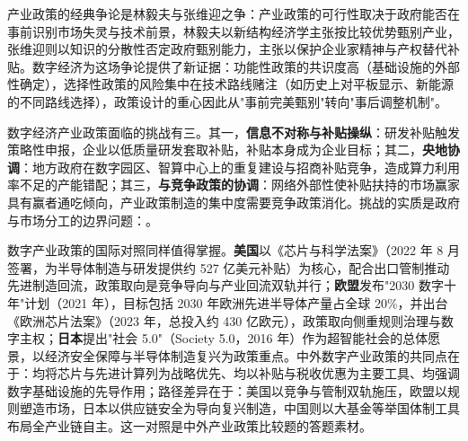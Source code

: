 产业政策的经典争论是林毅夫与张维迎之争：产业政策的可行性取决于政府能否在事前识别市场失灵与技术前景，林毅夫以新结构经济学主张按比较优势甄别产业，张维迎则以知识的分散性否定政府甄别能力，主张以保护企业家精神与产权替代补贴。数字经济为这场争论提供了新证据：功能性政策的共识度高（基础设施的外部性确定），选择性政策的风险集中在技术路线赌注（如历史上对平板显示、新能源的不同路线选择），政策设计的重心因此从"事前完美甄别"转向"事后调整机制"。

数字经济产业政策面临的挑战有三。其一，\textbf{信息不对称与补贴操纵}：研发补贴触发策略性申报，企业以低质量研发套取补贴，补贴本身成为企业目标；其二，\textbf{央地协调}：地方政府在数字园区、智算中心上的重复建设与招商补贴竞争，造成算力利用率不足的产能错配；其三，\textbf{与竞争政策的协调}：网络外部性使补贴扶持的市场赢家具有赢者通吃倾向，产业政策制造的集中度需要竞争政策消化。挑战的实质是政府与市场分工的边界问题：。

数字产业政策的国际对照同样值得掌握。\textbf{美国}以《芯片与科学法案》（2022 年 8 月签署，为半导体制造与研发提供约 527 亿美元补贴）为核心，配合出口管制推动先进制造回流，政策取向是竞争导向与产业回流双轨并行；\textbf{欧盟}发布"2030 数字十年"计划（2021 年），目标包括 2030 年欧洲先进半导体产量占全球 20\%，并出台《欧洲芯片法案》（2023 年，总投入约 430 亿欧元），政策取向侧重规则治理与数字主权；\textbf{日本}提出"社会 5.0"（Society 5.0，2016 年）作为超智能社会的总体愿景，以经济安全保障与半导体制造复兴为政策重点。中外数字产业政策的共同点在于：均将芯片与先进计算列为战略优先、均以补贴与税收优惠为主要工具、均强调数字基础设施的先导作用；路径差异在于：美国以竞争与管制双轨施压，欧盟以规则塑造市场，日本以供应链安全为导向复兴制造，中国则以大基金等举国体制工具布局全产业链自主。这一对照是中外产业政策比较题的答题素材。

